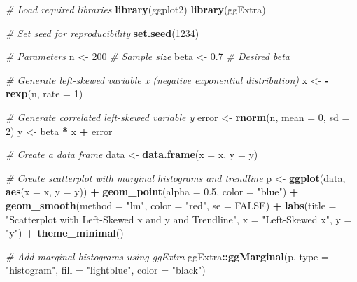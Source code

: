 \documentclass[
]{book}
\newenvironment{Shaded}{\begin{snugshade}}{\end{snugshade}}
\newcommand{\AttributeTok}[1]{\textcolor[rgb]{0.13,0.29,0.53}{#1}}
\newcommand{\CommentTok}[1]{\textcolor[rgb]{0.56,0.35,0.01}{\textit{#1}}}
\newcommand{\ConstantTok}[1]{\textcolor[rgb]{0.56,0.35,0.01}{#1}}
\newcommand{\DecValTok}[1]{\textcolor[rgb]{0.00,0.00,0.81}{#1}}
\newcommand{\FloatTok}[1]{\textcolor[rgb]{0.00,0.00,0.81}{#1}}
\newcommand{\FunctionTok}[1]{\textcolor[rgb]{0.13,0.29,0.53}{\textbf{#1}}}
\newcommand{\NormalTok}[1]{#1}
\newcommand{\OtherTok}[1]{\textcolor[rgb]{0.56,0.35,0.01}{#1}}
\newcommand{\SpecialCharTok}[1]{\textcolor[rgb]{0.81,0.36,0.00}{\textbf{#1}}}
\newcommand{\StringTok}[1]{\textcolor[rgb]{0.31,0.60,0.02}{#1}}
\begin{document}
\begin{Shaded}
\begin{Highlighting}[]
\CommentTok{\# Load required libraries}
\FunctionTok{library}\NormalTok{(ggplot2)}
\FunctionTok{library}\NormalTok{(ggExtra)}

\CommentTok{\# Set seed for reproducibility}
\FunctionTok{set.seed}\NormalTok{(}\DecValTok{1234}\NormalTok{)}

\CommentTok{\# Parameters}
\NormalTok{n }\OtherTok{\textless{}{-}} \DecValTok{200}  \CommentTok{\# Sample size}
\NormalTok{beta }\OtherTok{\textless{}{-}} \FloatTok{0.7}  \CommentTok{\# Desired beta}

\CommentTok{\# Generate left{-}skewed variable x (negative exponential distribution)}
\NormalTok{x }\OtherTok{\textless{}{-}} \SpecialCharTok{{-}}\FunctionTok{rexp}\NormalTok{(n, }\AttributeTok{rate =} \DecValTok{1}\NormalTok{)}

\CommentTok{\# Generate correlated left{-}skewed variable y}
\NormalTok{error }\OtherTok{\textless{}{-}} \FunctionTok{rnorm}\NormalTok{(n, }\AttributeTok{mean =} \DecValTok{0}\NormalTok{, }\AttributeTok{sd =} \DecValTok{2}\NormalTok{)}
\NormalTok{y }\OtherTok{\textless{}{-}}\NormalTok{ beta }\SpecialCharTok{*}\NormalTok{ x }\SpecialCharTok{+}\NormalTok{ error}

\CommentTok{\# Create a data frame}
\NormalTok{data }\OtherTok{\textless{}{-}} \FunctionTok{data.frame}\NormalTok{(}\AttributeTok{x =}\NormalTok{ x, }\AttributeTok{y =}\NormalTok{ y)}

\CommentTok{\# Create scatterplot with marginal histograms and trendline}
\NormalTok{p }\OtherTok{\textless{}{-}} \FunctionTok{ggplot}\NormalTok{(data, }\FunctionTok{aes}\NormalTok{(}\AttributeTok{x =}\NormalTok{ x, }\AttributeTok{y =}\NormalTok{ y)) }\SpecialCharTok{+}
  \FunctionTok{geom\_point}\NormalTok{(}\AttributeTok{alpha =} \FloatTok{0.5}\NormalTok{, }\AttributeTok{color =} \StringTok{"blue"}\NormalTok{) }\SpecialCharTok{+}
  \FunctionTok{geom\_smooth}\NormalTok{(}\AttributeTok{method =} \StringTok{"lm"}\NormalTok{, }\AttributeTok{color =} \StringTok{"red"}\NormalTok{, }\AttributeTok{se =} \ConstantTok{FALSE}\NormalTok{) }\SpecialCharTok{+}
  \FunctionTok{labs}\NormalTok{(}\AttributeTok{title =} \StringTok{"Scatterplot with Left{-}Skewed x and y and Trendline"}\NormalTok{,}
       \AttributeTok{x =} \StringTok{"Left{-}Skewed x"}\NormalTok{, }\AttributeTok{y =} \StringTok{"y"}\NormalTok{) }\SpecialCharTok{+}
  \FunctionTok{theme\_minimal}\NormalTok{()}

\CommentTok{\# Add marginal histograms using ggExtra}
\NormalTok{ggExtra}\SpecialCharTok{::}\FunctionTok{ggMarginal}\NormalTok{(p, }\AttributeTok{type =} \StringTok{"histogram"}\NormalTok{, }\AttributeTok{fill =} \StringTok{"lightblue"}\NormalTok{, }\AttributeTok{color =} \StringTok{"black"}\NormalTok{)}
\end{Highlighting}
\end{Shaded}
\end{document}
